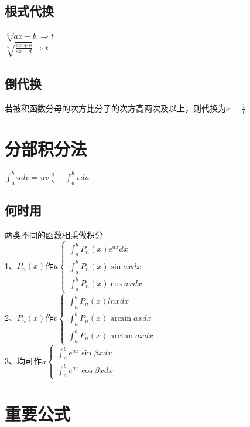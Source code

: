 \documentclass{article}
\begin{document}
\begin{flushleft}
	\subsection{根式代换}
	$\sqrt[n]{ax+b} \Rightarrow t$\\
	$\sqrt[n]{\frac{ax+b}{cx+d}} \Rightarrow t$\\
	\subsection{倒代换}
	若被积函数分母的次方比分子的次方高两次及以上，则代换为$x=\frac{1}{t}$\\
	
	\section{分部积分法}
	
	$\int_{a}^{b}udv=uv|_b^a-\int_{a}^{b}vdu$\\
	\subsection{何时用}
	两类不同的函数相乘做积分\\
	1、$P_n(x)$作$u \left\{
	\begin{array}{lcl}
	\int_{a}^{b} P_n(x)e^{ax}dx\\
	\int_{a}^{b} P_n(x)\sin axdx\\
	\int_{a}^{b} P_n(x)\cos axdx
	\end{array} \right.$\\
	2、$P_n(x)$作$v \left\{
	\begin{array}{lcl}
	\int_{a}^{b} P_n(x)lnxdx\\
	\int_{a}^{b} P_n(x)\arcsin axdx\\
	\int_{a}^{b} P_n(x)\arctan axdx
	\end{array} \right.$\\
	3、均可作$u \left\{
	\begin{array}{lcl}
	\int_{a}^{b} e^{ax}\sin \beta xdx\\
	\int_{a}^{b} e^{ax}\cos \beta xdx
	\end{array} \right.$\\
	
	\section{重要公式}
	

\end{flushleft}
\end{document}
